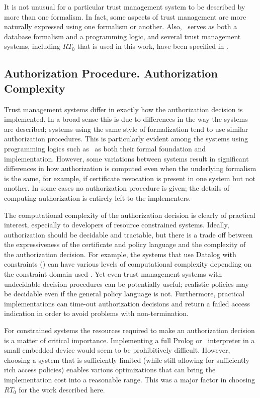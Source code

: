 It is not unusual for a particular trust management system to be described by more than one
formalism. In fact, some aspects of trust management are more naturally expressed using one
formalism or another. Also, \datalog\ serves as both a database formalism and a programming
logic, and several trust management systems, including $RT_0$ that is used in this work, have been
specified in \datalog \cite{Li:DCFTML}.

\subsection{Authorization Procedure. Authorization Complexity}

Trust management systems differ in exactly how the authorization decision is implemented. In a
broad sense this is due to differences in the way the systems are described; systems using the
same style of formalization tend to use similar authorization procedures. This is particularly
evident among the systems using programming logics such as \datalog\ as both their formal
foundation and implementation. However, some variations between systems result in significant
differences in how authorization is computed even when the underlying formalism is the same, for
example, if certificate revocation is present in one system but not another. In some cases no
authorization procedure is given; the details of computing authorization is entirely left to the
implementers.

The computational complexity of the authorization decision is clearly of practical interest,
especially to developers of resource constrained systems. Ideally, authorization should be
decidable and tractable, but there is a trade off between the expressiveness of the certificate
and policy language and the complexity of the authorization decision. For example, the systems
that use Datalog with constraints (\datalogc) can have various levels of computational
complexity depending on the constraint domain used \cite{Li:DCFTML}. Yet even trust management
systems with undecidable decision procedures can be potentially useful; realistic policies may
be decidable even if the general policy language is not. Furthermore, practical implementations
can time-out authorization decisions and return a failed access indication in order to avoid
problems with non-termination.

For constrained systems the resources required to make an authorization decision is a matter of
critical importance. Implementing a full Prolog or \datalogc\ interpreter in a small embedded
device would seem to be prohibitively difficult. However, choosing a system that is sufficiently
limited (while still allowing for sufficiently rich access policies) enables various
optimizations that can bring the implementation cost into a reasonable range. This was a major
factor in choosing $RT_0$ for the work described here.

